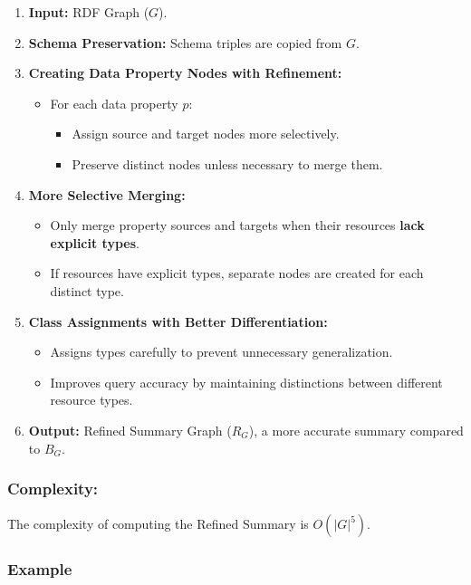 \documentclass[article,submit,pdftex,moreauthors]{Definitions/mdpi}
\begin{document}
\begin{enumerate}
    \item \textbf{Input:} RDF Graph ($G$).
    \item \textbf{Schema Preservation:} Schema triples are copied from $G$.
    \item \textbf{Creating Data Property Nodes with Refinement:}
    \begin{itemize}
        \item For each data property $p$:
        \begin{itemize}
            \item Assign source and target nodes more selectively.
            \item Preserve distinct nodes unless necessary to merge them.
        \end{itemize}
    \end{itemize}
    \item \textbf{More Selective Merging:}
    \begin{itemize}
        \item Only merge property sources and targets when their resources \textbf{lack explicit types}.
        \item If resources have explicit types, separate nodes are created for each distinct type.
    \end{itemize}
    \item \textbf{Class Assignments with Better Differentiation:}
    \begin{itemize}
        \item Assigns types carefully to prevent unnecessary generalization.
        \item Improves query accuracy by maintaining distinctions between different resource types.
    \end{itemize}
    \item \textbf{Output:} Refined Summary Graph ($R_G$), a more accurate summary compared to $B_G$.
\end{enumerate}

\subsubsection*{Complexity:}
The complexity of computing the Refined Summary is $O(|G|^5)$.

\subsubsection{\textbf{Example}}
\end{document}

